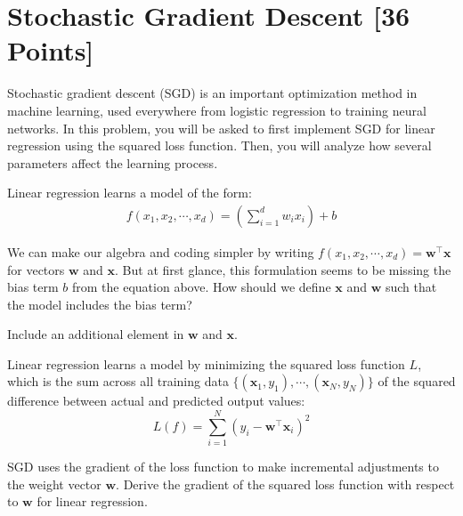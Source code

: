 \newpage
\section{Stochastic Gradient Descent [36 Points]}

Stochastic gradient descent (SGD) is an important optimization method in machine learning, used everywhere from logistic regression to training neural networks.
In this problem, you will be asked to first implement SGD for linear regression using the squared loss function.
Then, you will analyze how several parameters affect the learning process.

Linear regression learns a model of the form:
\begin{align*}
	f(x_1, x_2, \cdots, x_d) = \left(\sum_{i=1}^d w_i x_i\right) + b
\end{align*}

\begin{problem}[2]
We can make our algebra and coding simpler by writing $f(x_1, x_2, \cdots, x_d) = \mathbf{w}^\intercal\mathbf{x}$ for vectors $\mathbf{w}$ and $\mathbf{x}$.
But at first glance, this formulation seems to be missing the bias term $b$ from the equation above.
How should we define $\mathbf{x}$ and $\mathbf{w}$ such that the model includes the bias term?
\end{problem}
\begin{hint}
	Include an additional element in $\mathbf{w}$ and $\mathbf{x}$.
\end{hint}
\begin{solution}

\end{solution}

Linear regression learns a model by minimizing the squared loss function $L$, which is the sum across all training data $\{(\mathbf{x}_1, y_1),\cdots,(\mathbf{x}_N, y_N)\}$ of the squared difference between actual and predicted output values:
\[L(f) = \sum_{i=1}^N (y_i - \mathbf{w}^\intercal\mathbf{x}_i)^2\]

\begin{problem}[2]
SGD uses the gradient of the loss function to make incremental adjustments to the weight vector $\mathbf{w}$.
Derive the gradient of the squared loss function with respect to $\mathbf{w}$ for linear regression.
\end{problem}
\begin{solution}

\end{solution}

